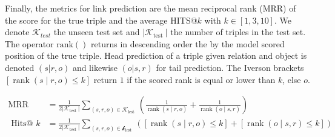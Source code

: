Finally, the metrics for link prediction are the mean reciprocal rank (MRR) of the score for the true triple and the average HITS@$k$ with $k \in [1,3,10]$. We denote $\mathcal{K}_{test}$ the unseen test set and $\left|\mathcal{K}_{\text {test }}\right|$ the number of triples in the test set. The operator $\operatorname{rank()}$ returns in descending order the by the model scored position of the true triple. Head prediction of a triple given relation and object is denoted $(s|r,o)$ and likewise $(o|s,r)$ for tail prediction. The Iverson brackets $[\operatorname{rank}(s \mid r, o) \leq k]$ return $1$ if the scored rank is equal or lower than $k$, else $o$. 


\begin{equation}
    \begin{aligned}
    \operatorname{MRR} &=\frac{1}{2\left|\mathcal{K}_{\text {test }}\right|} \sum_{(s, r, o) \in \mathcal{K}_{\text {lest }}}\left(\frac{1}{\operatorname{rank}(s \mid r, o)}+\frac{1}{\operatorname{rank}(o \mid s, r)}\right) \\
    \text { Hits@ } k &=\frac{1}{2\left|\mathcal{K}_{\text {test }}\right|} \sum_{(s, r, o) \in \mathcal{k}_{\text {lest }}}([\operatorname{rank}(s \mid r, o) \leq k]+[\operatorname{rank}(o \mid s, r) \leq k])
    \end{aligned}
\label{eq4:MRR}
\end{equation}







